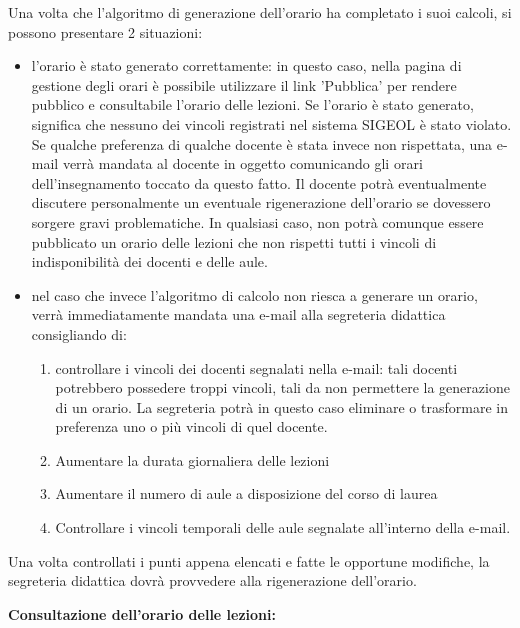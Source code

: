 \documentclass[11pt,a4paper]{article}
\begin{document}
Una volta che l'algoritmo di generazione dell'orario ha completato i suoi calcoli, si possono presentare 2 situazioni:
\begin{itemize}
 \item l'orario è stato generato correttamente: in questo caso, nella pagina di gestione degli orari è possibile utilizzare il link 'Pubblica' per rendere pubblico e consultabile l'orario delle lezioni. Se l'orario è stato generato, significa che nessuno dei vincoli registrati nel sistema SIGEOL è stato violato. Se qualche preferenza di qualche docente è stata invece non rispettata, una e-mail verrà mandata al docente in oggetto comunicando gli orari dell'insegnamento toccato da questo fatto. Il docente potrà eventualmente discutere personalmente un eventuale rigenerazione dell'orario se dovessero sorgere gravi problematiche. In qualsiasi caso, non potrà comunque essere pubblicato un orario delle lezioni che non rispetti tutti i vincoli di indisponibilità dei docenti e delle aule.
 \item nel caso che invece l'algoritmo di calcolo non riesca a generare un orario, verrà immediatamente mandata una e-mail alla segreteria didattica consigliando di:
	\begin{enumerate}
	 \item controllare i vincoli dei docenti segnalati nella e-mail: tali docenti potrebbero possedere troppi vincoli, tali da non permettere la generazione di un orario. La segreteria potrà in questo caso eliminare o trasformare in preferenza uno o più vincoli di quel docente.
	 \item Aumentare la durata giornaliera delle lezioni
	 \item Aumentare il numero di aule a disposizione del corso di laurea
	 \item Controllare i vincoli temporali delle aule segnalate all'interno della e-mail.
	\end{enumerate}
\end{itemize}
Una volta controllati i punti appena elencati e fatte le opportune modifiche, la segreteria didattica dovrà provvedere alla rigenerazione dell'orario.
\newline \newline
\begin{large}\textbf{Consultazione dell'orario delle lezioni:}\end{large}
\end{document}

